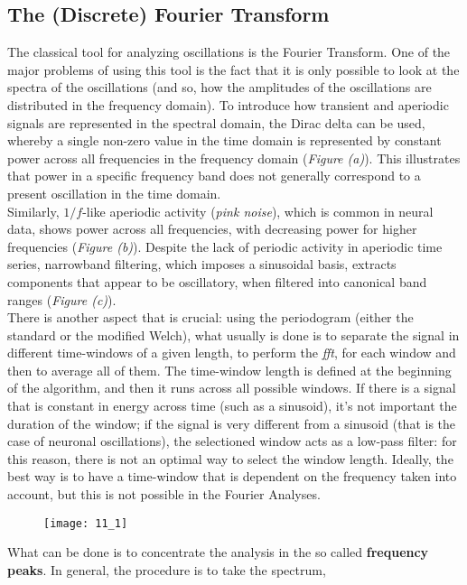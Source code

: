 \subsection{The (Discrete) Fourier Transform}
The classical tool for analyzing oscillations is the Fourier Transform. One of the major problems of using this tool is the fact that 
it is only possible to look at the spectra of the oscillations (and so, how the amplitudes of the oscillations are distributed in the frequency domain). 
To introduce how transient and aperiodic signals are represented in the spectral domain, the Dirac delta can be used, whereby a single non-zero value 
in the time domain is represented by constant power across all frequencies in the frequency domain (\textit{Figure (a)}). This illustrates that power in a specific 
frequency band does not generally correspond to a present oscillation in the time domain.\\
Similarly, \(1/f\)-like aperiodic activity (\textit{pink noise}), which is common in neural data, shows power across all frequencies, with decreasing power for 
higher frequencies (\textit{Figure (b)}). 
Despite the lack of periodic activity in aperiodic time series, narrowband filtering, which imposes a sinusoidal basis, extracts components that appear to be oscillatory, 
when filtered into canonical band ranges (\textit{Figure (c)}).\\
There is another aspect that is crucial: using the periodogram (either the standard or the modified Welch), what usually is done is to separate the signal in different time-windows of 
a given length, to perform the \textit{fft}, for each window and then to average all of them. The time-window length is defined at the beginning of the algorithm, and then it runs across 
all possible windows. If there is a signal that is constant in energy across time (such as a sinusoid), it's not important the duration of the window; if the signal is very different from 
a sinusoid (that is the case of neuronal oscillations), the selectioned window acts as a low-pass filter: for this reason, there is not an optimal way to select the window length. Ideally, 
the best way is to have a time-window that is dependent on the frequency taken into account, but this is not possible in the Fourier Analyses.
\begin{figure}[H]
    \texttt{[image: 11\_1]}
    \centering
\end{figure}
What can be done is to concentrate the analysis in the so called \textbf{frequency peaks}. In general, the procedure is to take the spectrum, 
